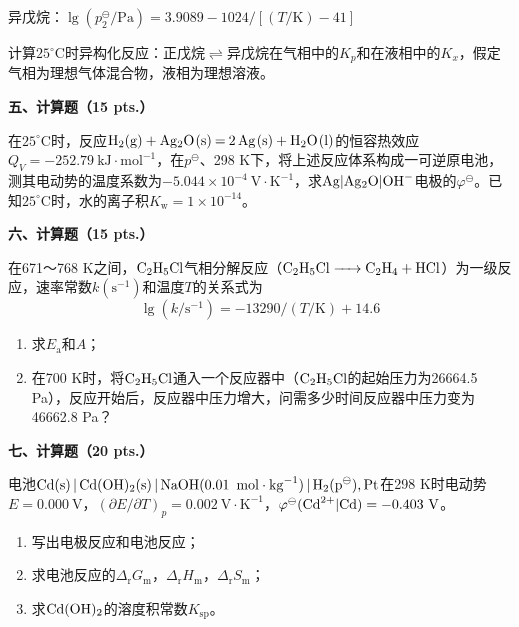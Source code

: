 异戊烷：$\lg(p_2^\ominus/\mathrm{Pa})=3.9089-1024/[(T/\mathrm{K})-41]$

计算$25^\circ\mathrm{C}$时异构化反应：正戊烷$\rightleftharpoons$异戊烷在气相中的$K_p$和在液相中的$K_x$，假定气相为理想气体混合物，液相为理想溶液。

\vspace{0.5cm}
\noindent\textbf{五、计算题（15 pts.）}

在$25^\circ\mathrm{C}$时，反应$\ce{H2(g) + Ag2O(s) = 2Ag(s) + H2O(l)}$的恒容热效应$Q_V=-252.79\ \mathrm{kJ\cdot mol^{-1}}$，在$p^\ominus$、298 K下，将上述反应体系构成一可逆原电池，测其电动势的温度系数为$-5.044\times10^{-4}\ \mathrm{V\cdot K^{-1}}$，求$\ce{Ag|Ag2O|OH-}$电极的$\varphi^\ominus$。已知$25^\circ\mathrm{C}$时，水的离子积$K_\mathrm{w}=1\times10^{-14}$。

\vspace{0.5cm}
\noindent\textbf{六、计算题（15 pts.）}

在671～768 K之间，$\ce{C2H5Cl}$气相分解反应（$\ce{C2H5Cl -> C2H4 + HCl}$）为一级反应，速率常数$k(\mathrm{s^{-1}})$和温度$T$的关系式为
\[
\lg(k/\mathrm{s^{-1}}) = -13290/(T/\mathrm{K}) + 14.6
\]
\begin{enumerate}[label=(\arabic*), itemsep=1ex]
    \item 求$E_\mathrm{a}$和$A$；
    \item 在700 K时，将$\ce{C2H5Cl}$通入一个反应器中（$\ce{C2H5Cl}$的起始压力为26664.5 Pa），反应开始后，反应器中压力增大，问需多少时间反应器中压力变为46662.8 Pa？
\end{enumerate}

\vspace{0.5cm}
\noindent\textbf{七、计算题（20 pts.）}

电池$\ce{Cd(s) | Cd(OH)2(s) | NaOH(0.01\ mol\cdot kg^{-1}) | H2(p^\ominus), Pt}$在298 K时电动势$E=0.000\ \mathrm{V}$，$(\partial E/\partial T)_p=0.002\ \mathrm{V\cdot K^{-1}}$，$\varphi^\ominus(\ce{Cd^{2+}|Cd})=-0.403\ \mathrm{V}$。
\begin{enumerate}[label=(\arabic*), itemsep=1ex]
    \item 写出电极反应和电池反应；
    \item 求电池反应的$\Delta_\mathrm{r}G_\mathrm{m}$，$\Delta_\mathrm{r}H_\mathrm{m}$，$\Delta_\mathrm{r}S_\mathrm{m}$；
    \item 求$\ce{Cd(OH)2}$的溶度积常数$K_{\mathrm{sp}}$。
\end{enumerate}